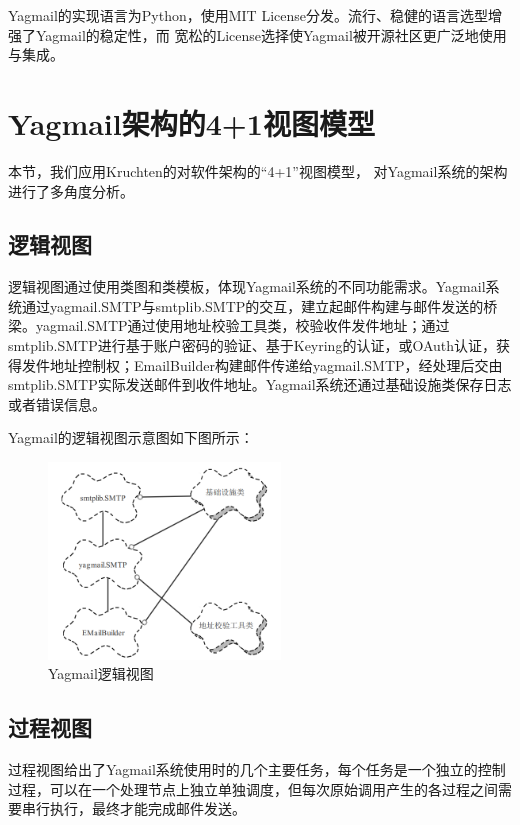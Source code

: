 \documentclass[UTF8,12pt,a4paper]{ctexart}
\begin{document}
Yagmail的实现语言为Python，使用MIT License分发。流行、稳健的语言选型增强了Yagmail的稳定性，而
宽松的License选择使Yagmail被开源社区更广泛地使用与集成。

\newpage
\section{Yagmail架构的4+1视图模型}

    本节，我们应用Kruchten的对软件架构的“4+1”视图模型\cite{fourplusone}，
    对Yagmail系统的架构进行了多角度分析。

\subsection{逻辑视图}
    逻辑视图通过使用类图和类模板，体现Yagmail系统的不同功能需求。Yagmail系统通过yagmail.SMTP与smtplib.SMTP的交互，建立起邮件构建与邮件发送的桥梁。yagmail.SMTP通过使用地址校验工具类，校验收件发件地址；通过smtplib.SMTP进行基于账户密码的验证、基于Keyring的认证，或OAuth认证，获得发件地址控制权；EmailBuilder构建邮件传递给yagmail.SMTP，经处理后交由smtplib.SMTP实际发送邮件到收件地址。Yagmail系统还通过基础设施类保存日志或者错误信息。
    
    Yagmail的逻辑视图示意图如下图所示：
    
    \begin{figure}[H]
        \centering
        \includegraphics[width=0.55\textwidth]{figure/log-view.png}
        \caption{Yagmail逻辑视图}
        \label{fig:log-view}
    \end{figure}

\subsection{过程视图}
    过程视图给出了Yagmail系统使用时的几个主要任务，每个任务是一个独立的控制过程，可以在一个处理节点上独立单独调度，但每次原始调用产生的各过程之间需要串行执行，最终才能完成邮件发送。
    
\end{document}
